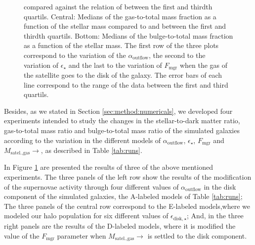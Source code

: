 \documentclass[usenatbib]{mn2e}
\begin{document}
\begin{figure}
{  compared against the relation of \citet{2010ApJ...710..903M} between
  the first and thirdth quartils. Central: Medians of the gas-to-total
  mass fraction as a  function of the stellar mass compared to
  \citet{2003ApJS..149..289B} and \citet{2003ApJ...585L.117B} between
  the first and thirdth quartils. Bottom: Medians of the
  bulge-to-total mass fraction as a function of the stellar mass. The
  first row of the three plots correspond to the variation of the
  $\alpha_{\text{outflow}}$, the second to the variation  of
  $\epsilon_{\star}$ and the last to the variation of $F_{\text{mgr}}$
  when the gas of the satellite goes to the disk of the galaxy. The
  error bars of each line correspond to the range of the data between
  the first and third quartils. \label{fig:properties-runs-compare}} 
\end{figure}

Besides, as we stated in Section \ref{sec:method:numericals}, we
developed four experiments intended to study the changes in the
stellar-to-dark matter ratio, gas-to-total mass ratio and
bulge-to-total mass ratio of the simulated galaxies according to the
variation in the different models of $\alpha_{\text{outflow}}$,
$\epsilon_\star$, $F_{\text{mgr}}$ and  $M_{\text{satel.,gas}}\to$, as
described in  Table \ref{tab:runs}.  

In Figure \ref{fig:properties-runs-compare} are presented the results
of three of the above mentioned experiments. The three panels of the
left row show the results of the modification of the supernovae
activity through four different values of $\alpha_{\text{outflow}}$ in
the disk component of the simulated galaxies, the A-labeled models of
Table \ref{tab:runs}; The three panels of the central row correspond
to the E-labeled models,where we modeled our halo population for six
different values of $\epsilon_{\text{disk},\star}$; And, in the three
right panels are the results of the D-labeled models, where it is
modified the value of the $F_{\text{mgr}}$ parameter when
$M_{\text{satel.,gas}}\to$ is settled to the disk component.  
\end{document}
